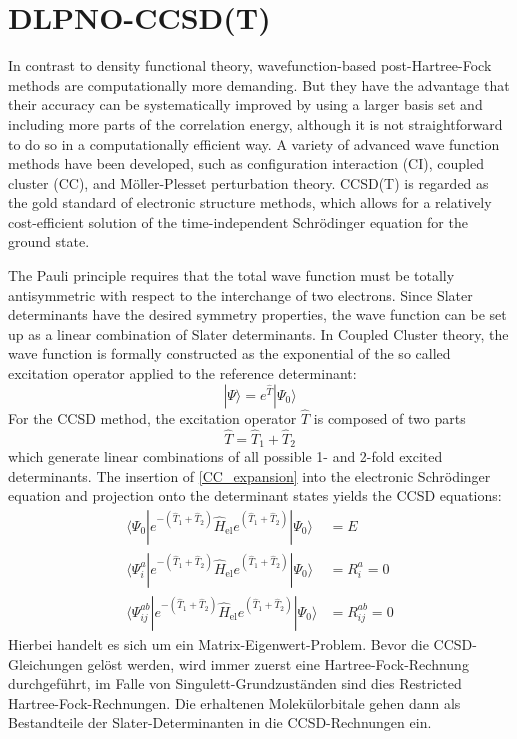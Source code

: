 \documentclass[9pt]{report}
\begin{document}
\section{DLPNO-CCSD(T)}
In contrast to density functional theory, wavefunction-based post-Hartree-Fock methods are computationally more demanding. But they have the advantage that their accuracy can be systematically improved by using a larger basis set and including more parts of the correlation energy, although it is not straightforward to do so in a computationally efficient way. A variety of advanced wave function methods have been developed, such as configuration interaction (CI), coupled cluster (CC), and Möller-Plesset perturbation theory. CCSD(T) is regarded as the gold standard of electronic structure methods, which allows for a relatively cost-efficient solution of the time-independent Schrödinger equation for the ground state.

The Pauli principle requires that the total wave function must be totally antisymmetric with respect to the interchange of two electrons. Since Slater determinants have the desired symmetry properties, the wave function can be set up as a linear combination of Slater determinants. In Coupled Cluster theory, the wave function is formally constructed as the exponential of the so called excitation operator applied to the reference determinant:
\begin{equation}
|\Psi\rangle = e^{\hat{T}}|\Psi_0\rangle\label{CC_expansion}
\end{equation}
For the CCSD method, the excitation operator $\hat{T}$ is composed of two parts
\begin{equation}
\hat{T} = \hat{T}_1 + \hat{T}_2
\end{equation}
which generate linear combinations of all possible 1- and 2-fold excited determinants. The insertion of \eqref{CC_expansion} into the electronic Schrödinger equation and projection onto the determinant states yields the CCSD equations:
\begin{align}
\langle\Psi_0|e^{-(\hat{T}_1+\hat{T}_2)}\hat{H}_{\mathrm{el}}e^{(\hat{T}_1+\hat{T}_2)}|\Psi_0\rangle &= E\\
\langle\Psi_{i}^{a}|e^{-(\hat{T}_1+\hat{T}_2)}\hat{H}_{\mathrm{el}}e^{(\hat{T}_1+\hat{T}_2)}|\Psi_0\rangle &= R_{i}^{a} = 0\\
\langle\Psi_{ij}^{ab}|e^{-(\hat{T}_1+\hat{T}_2)}\hat{H}_{\mathrm{el}}e^{(\hat{T}_1+\hat{T}_2)}|\Psi_0\rangle &= R_{ij}^{ab} = 0
\end{align}
Hierbei handelt es sich um ein Matrix-Eigenwert-Problem. Bevor die CCSD-Gleichungen gelöst werden, wird immer zuerst eine Hartree-Fock-Rechnung durchgeführt, im Falle von Singulett-Grundzuständen sind dies Restricted Hartree-Fock-Rechnungen. Die erhaltenen Molekülorbitale gehen dann als Bestandteile der Slater-Determinanten in die CCSD-Rechnungen ein.
\end{document}
